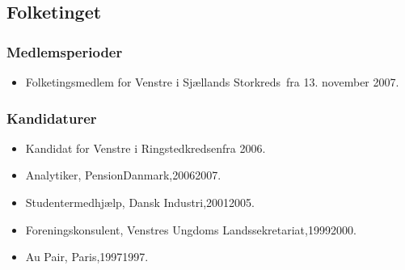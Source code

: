 \documentclass[11pt, a4paper]{awesome-cv}
\begin{document}
\begin{cvletter}
\subsection*{Folketinget}
\subsubsection*{Medlemsperioder}
\begin{itemize}
\item Folketingsmedlem for Venstre i Sjællands Storkreds fra 13. november 2007.
\end{itemize}
\subsubsection*{Kandidaturer}
\begin{itemize}
\item Kandidat for Venstre i Ringstedkredsenfra 2006.
\end{itemize}
\begin{itemize}
\item Analytiker, PensionDanmark,20062007.
\item Studentermedhjælp, Dansk Industri,20012005.
\item Foreningskonsulent, Venstres Ungdoms Landssekretariat,19992000.
\item Au Pair, Paris,19971997.
\end{itemize}
\end{cvletter}
\end{document}
